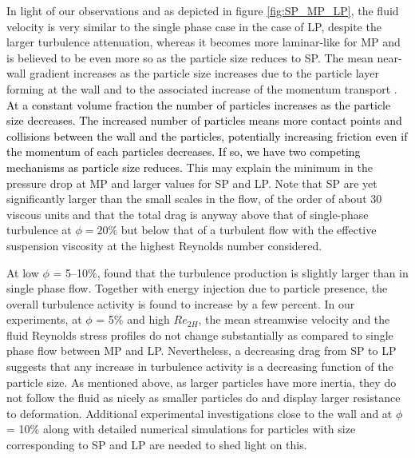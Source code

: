 \documentclass{jfm}
\def\sz#1{{\textcolor{black}{#1}}}
\begin{document}
In light of our observations and as depicted in figure \ref{fig:SP_MP_LP}, the fluid velocity is very similar to the single phase case in the case of LP, despite the larger turbulence attenuation, whereas it becomes more laminar-like for MP and is believed to be even more so as the particle size reduces to SP.  
The mean near-wall gradient increases as the particle size increases due to the particle layer forming at the wall and to the associated increase of the momentum transport 
\citep{costa2016universal}.
\sz{At a constant volume fraction the number of particles increases as the particle size decreases. The increased number of particles means more contact points and collisions between the wall and the particles, potentially increasing friction even if the momentum of each particles decreases. If so, we have two competing mechanisms as particle size reduces.} This may explain the minimum in the pressure drop at MP and larger values for SP and LP. Note that SP are yet significantly larger than the small scales in the flow, of the order of about 30 viscous units and that the total drag is anyway above that of single-phase turbulence at $\phi=20\%$ but below that of a turbulent flow with the effective suspension viscosity at the highest Reynolds number considered.
 

At low $\phi$ = 5--10\%, \cite{fornari2017suspensions} found that the turbulence production is slightly larger than in single phase flow. Together with energy injection due to particle presence, the overall turbulence activity is found to increase by a few percent. In our experiments, at $\phi$ = 5\% and high $Re_{2H}$, the mean streamwise velocity and the fluid Reynolds stress profiles do not change substantially as compared to single phase flow between MP and LP. Nevertheless, a decreasing drag from SP to LP suggests that any increase in turbulence activity is a decreasing function of the particle size. As mentioned above, as larger particles have more inertia, they do not follow the fluid as nicely as smaller particles do and display larger resistance to deformation. Additional experimental investigations close to the wall and at $\phi$ = 10\% along with detailed numerical simulations for particles with size corresponding to SP and LP are needed to shed light on this.
\end{document}
